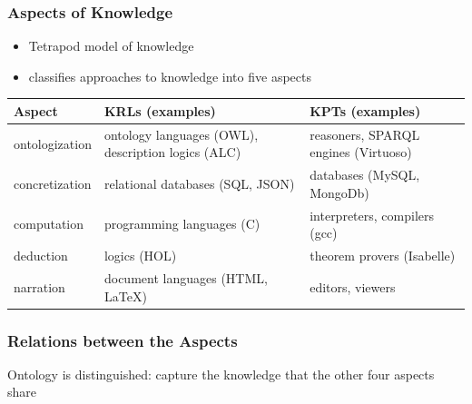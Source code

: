 \begin{frame}\frametitle{Aspects of Knowledge}
\begin{itemize}
\item Tetrapod model of knowledge
\item classifies approaches to knowledge into five aspects
\end{itemize}

\begin{center}
\begin{tabular}{lll}
Aspect & KRLs (examples) & KPTs (examples) \\
\hline
ontologization & ontology languages (OWL), description logics (ALC) & reasoners, SPARQL engines (Virtuoso) \\
concretization & relational databases (SQL, JSON) & databases (MySQL, MongoDb) \\
computation & programming languages (C) & interpreters, compilers (gcc) \\
deduction & logics (HOL) & theorem provers (Isabelle) \\
narration & document languages (HTML, LaTeX) & editors, viewers
\end{tabular}
\end{center}
\end{frame}

\begin{frame}\frametitle{Relations between the Aspects}
Ontology is distinguished: capture the knowledge that the other four aspects share

\begin{center}
\end{center}
\end{frame}

